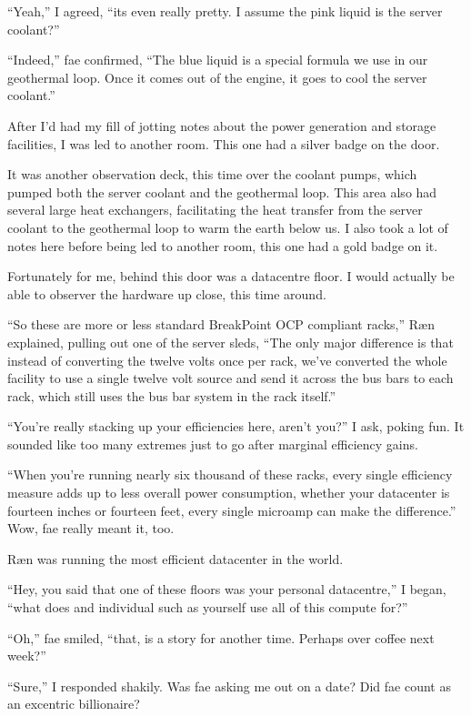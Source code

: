 ``Yeah,'' I agreed, ``its even really pretty.  I assume the pink liquid is the server coolant?''

``Indeed,'' fae confirmed, ``The blue liquid is a special formula we use in our geothermal loop.  Once it comes out of the engine, it goes to cool the server coolant.''

After I'd had my fill of jotting notes about the power generation and storage facilities, I was led to another room.  This one had a silver badge on the door.

It was another observation deck, this time over the coolant pumps, which pumped both the server coolant and the geothermal loop.  This area also had several large heat exchangers, facilitating the heat transfer from the server coolant to the geothermal loop to warm the earth below us.  I also took a lot of notes here before being led to another room, this one had a gold badge on it.

Fortunately for me, behind this door was a datacentre floor.  I would actually be able to observer the hardware up close, this time around.

``So these are more or less standard BreakPoint OCP compliant racks,'' Ræn explained, pulling out one of the server sleds, ``The only major difference is that instead of converting the twelve volts once per rack, we've converted the whole facility to use a single twelve volt source and send it across the bus bars to each rack, which still uses the bus bar system in the rack itself.''

``You're really stacking up your efficiencies here, aren't you?'' I ask, poking fun.  It sounded like too many extremes just to go after marginal efficiency gains.

``When you're running nearly six thousand of these racks, every single efficiency measure adds up to less overall power consumption, whether your datacenter is fourteen inches or fourteen feet, every single microamp can make the difference.''  Wow, fae really meant it, too.

Ræn was running the most efficient datacenter in the world.

``Hey, you said that one of these floors was your personal datacentre,'' I began, ``what does and individual such as yourself use all of this compute for?''

``Oh,'' fae smiled, ``that, is a story for another time.  Perhaps over coffee next week?''

``Sure,'' I responded shakily.  Was fae asking me out on a date?  Did fae count as an excentric billionaire?

